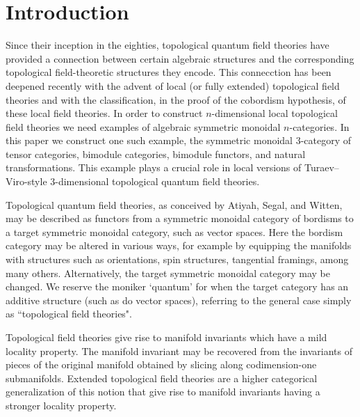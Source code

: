 \documentclass[a4paper]{amsart}
\begin{document}
\setcounter{tocdepth}{1}
\tableofcontents



\section{Introduction}
Since their inception in the eighties, topological quantum field theories have provided a connection between certain algebraic structures and the corresponding topological field-theoretic structures they encode. This connecction has been deepened recently with the advent of local (or fully extended) topological field theories and with the classification, in the proof of the cobordism hypothesis, of these local field theories.  In order to construct $n$-dimensional local topological field theories we need examples of algebraic symmetric monoidal $n$-categories.  In this paper we construct one such example, the symmetric monoidal $3$-category of tensor categories, bimodule categories, bimodule functors, and natural transformations.  This example plays a crucial role in local versions of Turaev--Viro-style $3$-dimensional topological quantum field theories.  %

Topological quantum field theories, as conceived by Atiyah, Segal, and Witten, may be described as functors from a symmetric monoidal category of bordisms to a target symmetric monoidal category, such as vector spaces.  Here the bordism category may be altered in various ways, for example by equipping the manifolds with structures such as orientations, spin structures, tangential framings, among many others.  Alternatively, the target symmetric monoidal category may be changed. We reserve the moniker `quantum' for when the target category has an additive structure (such as do vector spaces), referring to the general case simply as ``topological field theories".

Topological field theories give rise to manifold invariants which have a mild locality property. The manifold invariant may be recovered from the invariants of pieces of the original manifold obtained by slicing along codimension-one submanifolds. Extended topological field theories are a higher categorical generalization of this notion that give rise to manifold invariants having a stronger locality property. 
\end{document}

